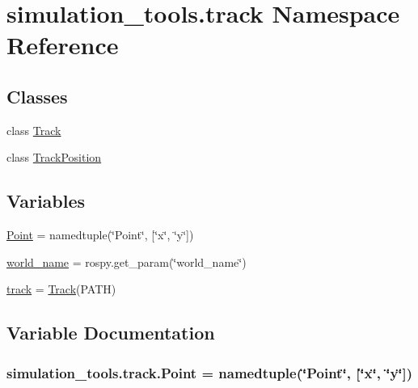 \hypertarget{namespacesimulation__tools_1_1track}{}\section{simulation\+\_\+tools.\+track Namespace Reference}
\label{namespacesimulation__tools_1_1track}
\subsection*{Classes}
\begin{DoxyCompactItemize}
\item 
class \hyperlink{classsimulation__tools_1_1track_1_1_track}{Track}
\item 
class \hyperlink{classsimulation__tools_1_1track_1_1_track_position}{Track\+Position}
\end{DoxyCompactItemize}
\subsection*{Variables}
\begin{DoxyCompactItemize}
\item 
\hyperlink{namespacesimulation__tools_1_1track_a927c1793846ca41f328e4b427075cafd}{Point} = namedtuple(\char`\"{}Point\char`\"{}, \mbox{[}\char`\"{}x\char`\"{}, \char`\"{}y\char`\"{}\mbox{]})
\item 
\hyperlink{namespacesimulation__tools_1_1track_ab4fe6910a622507d50763ab0aeb7d990}{world\+\_\+name} = rospy.\+get\+\_\+param(\char`\"{}world\+\_\+name\char`\"{})
\item 
\hyperlink{namespacesimulation__tools_1_1track_ac731095c2502c445d46302406cb81651}{track} = \hyperlink{classsimulation__tools_1_1track_1_1_track}{Track}(P\+A\+TH)
\end{DoxyCompactItemize}


\subsection{Variable Documentation}
\subsubsection[{\texorpdfstring{Point}{Point}}]{\setlength{\rightskip}{0pt plus 5cm}simulation\+\_\+tools.\+track.\+Point = namedtuple(\char`\"{}Point\char`\"{}, \mbox{[}\char`\"{}x\char`\"{}, \char`\"{}y\char`\"{}\mbox{]})}\hypertarget{namespacesimulation__tools_1_1track_a927c1793846ca41f328e4b427075cafd}{}\label{namespacesimulation__tools_1_1track_a927c1793846ca41f328e4b427075cafd}


